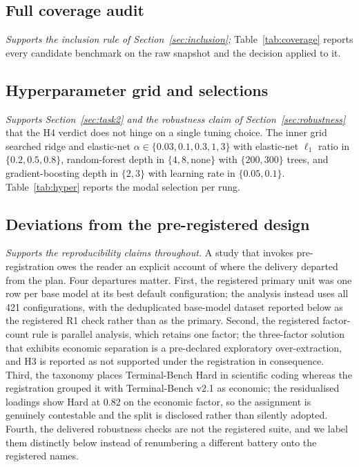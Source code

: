 \subsection{Full coverage audit}\label{app:coverage}
\emph{Supports the inclusion rule of Section~\ref{sec:inclusion};} Table~\ref{tab:coverage} reports every
candidate benchmark on the raw snapshot and the decision applied to it.



\subsection{Hyperparameter grid and selections}\label{app:hyper}
\emph{Supports Section~\ref{sec:task2} and the robustness claim of Section~\ref{sec:robustness}} that the
H4 verdict does not hinge on a single tuning choice. The inner grid searched ridge and elastic-net
$\alpha\in\{0.03,0.1,0.3,1,3\}$ with elastic-net $\ell_1$ ratio in $\{0.2,0.5,0.8\}$, random-forest
depth in $\{4,8,\text{none}\}$ with $\{200,300\}$ trees, and gradient-boosting depth in $\{2,3\}$ with
learning rate in $\{0.05,0.1\}$. Table~\ref{tab:hyper} reports the modal selection per rung.



\subsection{Deviations from the pre-registered design}\label{app:deviations}
\emph{Supports the reproducibility claims throughout.} A study that invokes pre-registration owes the
reader an explicit account of where the delivery departed from the plan. Four departures matter. First,
the registered primary unit was one row per base model at its best default configuration; the analysis
instead uses all 421 configurations, with the deduplicated base-model dataset reported below as the
registered R1 check rather than as the primary. Second, the registered factor-count rule is parallel
analysis, which retains one factor; the three-factor solution that exhibits economic separation is a
pre-declared exploratory over-extraction, and H3 is reported as not supported under the registration in
consequence. Third, the taxonomy places Terminal-Bench Hard in scientific coding whereas the
registration grouped it with Terminal-Bench v2.1 as economic; the residualised loadings show Hard at
0.82 on the economic factor, so the assignment is genuinely contestable and the split is disclosed
rather than silently adopted. Fourth, the delivered robustness checks are not the registered suite, and
we label them distinctly below instead of renumbering a different battery onto the registered names.

